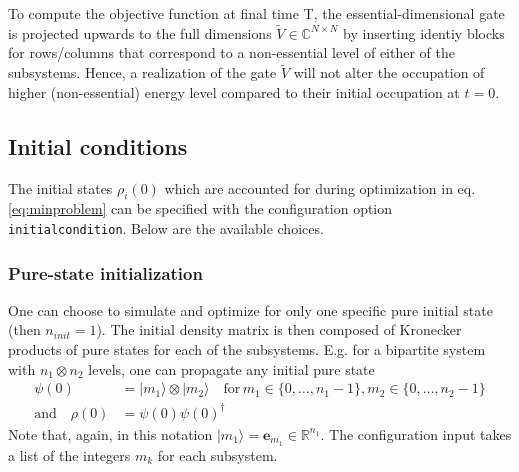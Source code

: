 \documentclass[11pt]{article}
\newcommand{\R}{\mathds{R}}
\newcommand{\C}{\mathds{C}}
\begin{document}
To compute the objective function at final time T, the essential-dimensional gate is projected upwards to the full dimensions $\tilde V \in \C^{N\times N}$ by inserting identiy blocks for rows/columns that correspond to a non-essential level of either of the subsystems. Hence, a realization of the gate $\tilde V$ will not alter the occupation of higher (non-essential) energy level compared to their initial occupation at $t=0$. 

 


\subsection{Initial conditions}\label{subsec:initcond}
The initial states $\rho_i(0)$ which are accounted for during optimization in eq. \eqref{eq:minproblem} can be specified with the configuration option \texttt{initialcondition}. Below are the available choices. 

\subsubsection{Pure-state initialization}
One can choose to simulate and optimize for only one specific pure initial state (then $n_{init} = 1$). The initial density matrix is then composed of Kronecker products of pure states for each of the subsystems. E.g. for a bipartite system with $n_1
\otimes n_2$ levels, one can propagate any initial pure state 
\begin{align}
  \psi(0) &= |m_1\rangle \otimes |m_2\rangle \quad \text{for} \, m_1 \in \{0,\dots, n_1-1\}, m_2\in \{0,\dots, n_2-1\}\\
   \text{and} \quad \rho(0) &= \psi(0)\psi(0)^\dagger 
\end{align}
Note that, again, in this notation $|m_1\rangle = \boldsymbol{e}_{m_1} \in \R^{n_1}$. The configuration input takes a list of the integers $m_k$ for each subsystem. 
\end{document}
